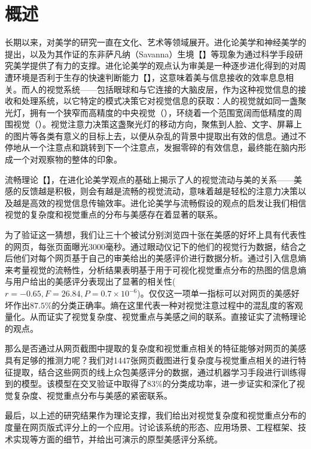 
\chapter{概述}
\label{chap:introduction}
长期以来，对美学的研究一直在文化、艺术等领域展开。进化论美学和神经美学的提出，以及为其作证的东非萨凡纳（Savanna）生境【】等现象为通过科学手段研究美学提供了有力的支撑。进化论美学的观点认为审美是一种逐步进化得到的对周遭环境是否利于生存的快速判断能力【】，这意味着美与信息接收的效率息息相关。而人的视觉系统——包括眼球和与它连接的大脑皮层，作为这种视觉信息的接收和处理系统，以它特定的模式决策它对视觉信息的获取：人的视觉就如同一盏聚光灯，拥有一个狭窄而高精度的中央视觉（），环绕着一个范围宽阔而低精度的周围视觉（）。视觉注意力决策这盏聚光灯的移动方向，聚焦到人脸、文字、屏幕上的图片等各类有意义的目标上去，以便从杂乱的背景中提取出有效的信息。通过不停地从一个注意点和跳转到下一个注意点，发掘零碎的有效信息，最终能在脑内形成一个对观察物的整体的印象。

流畅理论【】，在进化论美学观点的基础上揭示了人的视觉流动与美的关系——美感的反馈越是积极，则会有越是流畅的视觉流动，意味着越是轻松的注意力决策以及越是高效的视觉信息传输效率。进化论美学与流畅假设的观点的启发让我们相信视觉的复杂度和视觉重点的分布与美感存在着显著的联系。

为了验证这一猜想，我们让三十个被试分别浏览四十张在美感的好坏上具有代表性的网页，每张页面曝光3000毫秒。通过眼动仪记下的他们的视觉行为数据，结合之后他们对每个网页基于自己的审美给出的美感评价进行数据分析。通过引入信息熵来考量视觉的流畅性，分析结果表明基于用于可视化视觉重点分布的热图的信息熵与用户给出的美感评分表现出了显著的相关性($r=-0.65, F=26.84, P=0.7\times 10^{-6}$)。仅仅这一项单一指标可以对网页的美感好坏作出$87.5\%$的分类正确率。熵在这里代表一种对视觉注意过程中的混乱度的客观量化。从而证实了视觉复杂度、视觉重点与美感之间的联系。直接证实了流畅理论的观点。

那么是否通过从网页截图中提取的复杂度和视觉重点相关的特征能够对网页的美感具有足够的推测力呢？我们对1447张网页截图进行复杂度与视觉重点相关的进行特征提取，结合这些网页的线上众包美感评分的数据，通过机器学习手段进行训练得到的模型。该模型在交叉验证中取得了$83\%$的分类成功率，进一步证实和深化了视觉复杂度、视觉重点分布与美感的紧密联系。

最后，以上述的研究结果作为理论支撑，我们给出对视觉复杂度和视觉重点分布的度量在网页版式评分上的一个应用。讨论该系统的形态、应用场景、工程框架、技术实现等方面的细节，并给出可演示的原型美感评分系统。
